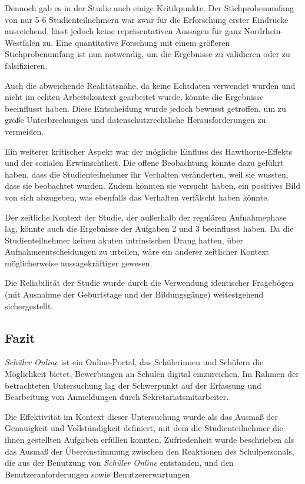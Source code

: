 Dennoch gab es in der Studie auch einige Kritikpunkte. Der Stichprobenumfang von nur 5-6 Studienteilnehmern war zwar für die Erforschung erster Eindrücke ausreichend, lässt jedoch keine repräsentativen Aussagen für ganz Nordrhein-Westfalen zu. Eine quantitative Forschung mit einem größeren Stichprobenumfang ist nun notwendig, um die Ergebnisse zu validieren oder zu falsifizieren.

Auch die abweichende Realitätsnähe, da keine Echtdaten verwendet wurden und nicht im echten Arbeitskontext gearbeitet wurde, könnte die Ergebnisse beeinflusst haben. Diese Entscheidung wurde jedoch bewusst getroffen, um zu große Unterbrechungen und datenschutzrechtliche Herausforderungen zu vermeiden.

Ein weiterer kritischer Aspekt war der mögliche Einfluss des Hawthorne-Effekts und der sozialen Erwünschtheit. Die offene Beobachtung könnte dazu geführt haben, dass die Studienteilnehmer ihr Verhalten veränderten, weil sie wussten, dass sie beobachtet wurden. Zudem könnten sie versucht haben, ein positives Bild von sich abzugeben, was ebenfalls das Verhalten verfälscht haben könnte.

Der zeitliche Kontext der Studie, der außerhalb der regulären Aufnahmephase lag, könnte auch die Ergebnisse der Aufgaben 2 und 3 beeinflusst haben. Da die Studienteilnehmer keinen akuten intrinsischen Drang hatten, über Aufnahmeentscheidungen zu urteilen, wäre ein anderer zeitlicher Kontext möglicherweise aussagekräftiger gewesen.

Die Reliabilität der Studie wurde durch die Verwendung identischer Fragebögen (mit Ausnahme der Geburtstage und der Bildungsgänge) weitestgehend sichergestellt.

\subsection{Fazit}

\textit{Schüler Online} ist ein Online-Portal, das Schülerinnen und Schülern die Möglichkeit bietet, Bewerbungen an Schulen digital einzureichen. Im Rahmen der betrachteten Untersuchung lag der Schwerpunkt auf der Erfassung und Bearbeitung von Anmeldungen durch Sekretariatsmitarbeiter.

Die Effektivität im Kontext dieser Untersuchung wurde als das Ausmaß der Genauigkeit und Vollständigkeit definiert, mit dem die Studienteilnehmer die ihnen gestellten Aufgaben erfüllen konnten. Zufriedenheit wurde beschrieben als das Ausmaß der Übereinstimmung zwischen den Reaktionen des Schulpersonals, die aus der Benutzung von \textit{Schüler Online} entstanden, und den Benutzeranforderungen sowie Benutzererwartungen.

